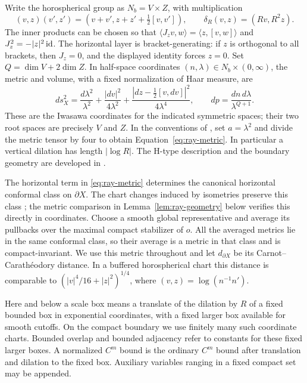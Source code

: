 Write the horospherical group as \(N_b=V\times Z\), with multiplication
\[
 (v,z)(v',z')=(v+v',z+z'+\tfrac12[v,v']),\qquad
 \delta_R(v,z)=(Rv,R^2z).
\]
The inner products can be chosen so that
\(\langle J_zv,w\rangle=\langle z,[v,w]\rangle\) and
\(J_z^2=-|z|^2\operatorname{id}\).  The horizontal layer is bracket-generating:
if \(z\) is orthogonal to all brackets, then \(J_z=0\), and the
displayed identity forces \(z=0\).  Set \(Q=\dim V+2\dim Z\).
In half-space coordinates \((n,\lambda)\in N_b\times(0,\infty)\), the
metric and volume, with a fixed normalization of Haar measure, are
\begin{equation}\label{eq:ray-metric}
 ds_X^2=\frac{d\lambda^2}{\lambda^2}
       +\frac{|dv|^2}{4\lambda^2}
       +\frac{|dz-\tfrac12[v,dv]|^2}{4\lambda^4},
 \qquad dp=\frac{dn\,d\lambda}{\lambda^{Q+1}}.
\end{equation}
These are the Iwasawa coordinates for the indicated symmetric spaces;
their two root spaces are precisely \(V\) and \(Z\). In the conventions
of \cite[Section~1, Proposition~1]{DamekRicci1992}, set $a=\lambda^2$
and divide the metric tensor by four to obtain
Equation~\eqref{eq:ray-metric}. In particular a vertical dilation has
length \(|\log R|\). The H-type description and the boundary geometry
are developed in \cite{CDKR1991,CDKR1998,Pansu1989}.

The horizontal term in \eqref{eq:ray-metric} determines the canonical
horizontal conformal class on \(\partial X\). The chart changes induced
by isometries preserve this class \cite[Lemma~9.6]{Pansu1989}; the metric
comparison in Lemma~\ref{lem:ray-geometry} below verifies this directly
in coordinates. Choose a smooth global
representative and average its pullbacks over the maximal compact
stabilizer of \(o\). All the averaged metrics lie in the same conformal
class, so their average is a metric in that class and is compact-invariant.
We use this metric throughout and let \(d_{\partial X}\) be its
Carnot--Carath\'eodory distance. In a buffered horospherical chart this
distance is comparable to \((|v|^4/16+|z|^2)^{1/4}\), where
\((v,z)=\log(n^{-1}n')\).

Here and below a scale box means a translate of the dilation by \(R\) of
a fixed bounded box in exponential coordinates, with a fixed larger box
available for smooth cutoffs.  On the compact boundary we use finitely
many such coordinate charts.  Bounded overlap and bounded adjacency refer
to constants for these fixed larger boxes.  A normalized \(C^m\) bound
is the ordinary \(C^m\) bound after translation and dilation to the fixed
box.  Auxiliary variables ranging in a fixed compact set may be appended.

